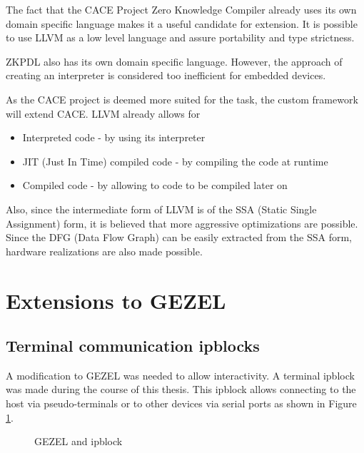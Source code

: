 The fact that the CACE Project Zero Knowledge Compiler already uses
its own domain specific language makes it a useful candidate for
extension. It is possible to use LLVM as a low level language and
assure portability and type strictness.

ZKPDL also has its own domain specific language. However, the approach
of creating an interpreter is considered too inefficient for embedded
devices.

As the CACE project is deemed more suited for the task, the custom
framework will extend CACE. LLVM already allows for
\begin{itemize}
\item Interpreted code - by using its interpreter
\item JIT (Just In Time) compiled code - by compiling the code at runtime
\item Compiled code - by allowing to code to be compiled later on
\end{itemize}
Also, since the intermediate form of LLVM is of the SSA (Static Single
Assignment) form, it is believed that more aggressive optimizations
are possible. Since the DFG (Data Flow Graph) can be easily extracted
from the SSA form, hardware realizations are also made possible.

\section{Extensions to GEZEL}

\subsection{Terminal communication ipblocks}

A modification to GEZEL was needed to allow interactivity. A terminal
ipblock was made during the course of this thesis. This ipblock allows
connecting to the host via pseudo-terminals or to other devices via
serial ports as shown in Figure \ref{fig:gezel_ipblock}.

\begin{figure}[hb!]
  \centering
  \caption{GEZEL and ipblock}
  \label{fig:gezel_ipblock}
\end{figure}

